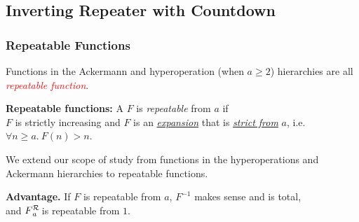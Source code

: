 \subsection{Inverting Repeater with Countdown}

\begin{frame}
\frametitle{Repeatable Functions}

Functions in the Ackermann and hyperoperation (when $a\ge 2$) hierarchies are all \textcolor{red}{\emph{repeatable function}}.

\bigskip
%
%

\pause
\textbf{Repeatable functions:} A $F$ is \emph{repeatable} from $a$ if\\
$F$ is strictly increasing and $F$ is an
\href{https://github.com/inv-ack/inv-ack/blob/7270e64a2600b771f2b1b1b151f7d13fb2ae6c97/increasing_expanding.v\#L80-L82}{\emph{expansion}}
that is
\href{https://github.com/inv-ack/inv-ack/blob/7270e64a2600b771f2b1b1b151f7d13fb2ae6c97/increasing_expanding.v\#L84-L86}{\emph{strict from}}
$a$, i.e. ~$\forall n \ge a.~ F(n) > n$.

\bigskip
\pause
We extend our scope of study from functions in the hyperoperations and Ackermann hierarchies to repeatable functions.

\bigskip
\pause
\textbf{Advantage.} If $F$ is repeatable from $a$, $F^{-1}$ makes sense and is total,
\\ and $\rf{F}{a}$ is repeatable from $1$.

\end{frame}



